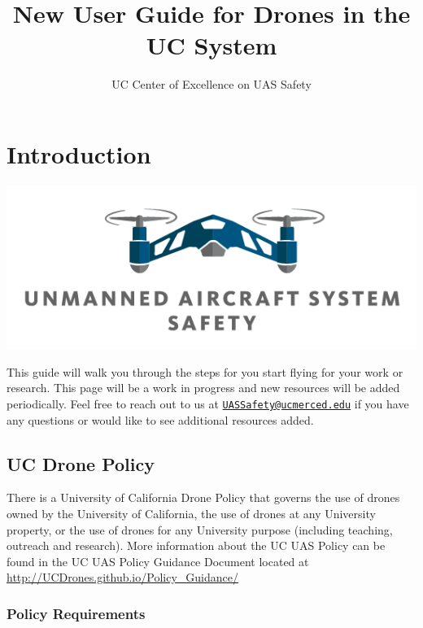 \documentclass[
]{book}
\title{New User Guide for Drones in the UC System}
\author{UC Center of Excellence on UAS Safety}
\date{}
\begin{document}
\maketitle

{
\setcounter{tocdepth}{1}
\tableofcontents
}
\hypertarget{introduction}{%
\chapter*{Introduction}\label{introduction}}

\begin{center}\includegraphics[width=0.5\linewidth]{images/COE_logo} \end{center}

This guide will walk you through the steps for you start flying for your work or research. This page will be a work in progress and new resources will be added periodically. Feel free to reach out to us at \href{mailto:UASSafety@ucmerced.edu}{\nolinkurl{UASSafety@ucmerced.edu}} if you have any questions or would like to see additional resources added.

\hypertarget{uc-drone-policy}{%
\section*{UC Drone Policy}\label{uc-drone-policy}}

There is a University of California Drone Policy that governs the use of drones owned by the University of California, the use of drones at any University property, or the use of drones for any University purpose (including teaching, outreach and research). More information about the UC UAS Policy can be found in the UC UAS Policy Guidance Document located at \url{http://UCDrones.github.io/Policy_Guidance/}

\hypertarget{policy-requirements}{%
\subsection*{Policy Requirements}\label{policy-requirements}}
\end{document}
